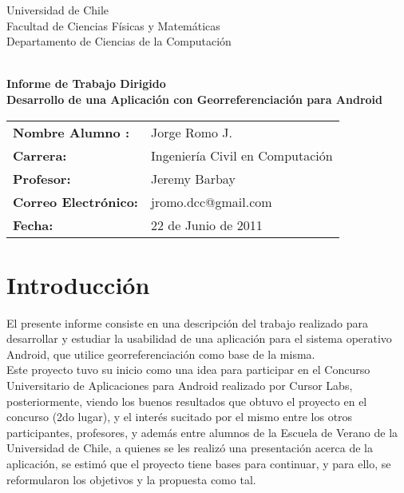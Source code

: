 \documentclass[10pt,letterpaper]{article}
\begin{document}
\begin{titlepage}
\begin{minipage}{12cm} Universidad de Chile
\\ Facultad de Ciencias F\'isicas y Matem\'aticas
\\ Departamento de Ciencias de la Computaci\'on\\
\\
\end{minipage}
\vspace*{2cm}
\begin{center}
\vspace{0.2cm}
{\Huge\bf\vspace{0.5cm} Informe de Trabajo Dirigido}\\
{\Huge\bf\vspace{0.5cm} Desarrollo de una Aplicación con Georreferenciación para Android}\\
\end{center}
\vspace{4cm}
\begin{tabular}{ll}
\bf{Nombre Alumno :}& Jorge Romo J. \\
\bf{Carrera:} & Ingeniería Civil en Computación\\ 
\bf{Profesor:} & Jeremy Barbay  \\ 
\bf{Correo Electrónico:} & jromo.dcc@gmail.com  \\ 
\bf{Fecha:} & 22 de Junio de 2011  \\ 
\end{tabular}
\end{titlepage}
\newpage
\tableofcontents
\setcounter{tocdepth}{1}

\newpage
\section{Introducción}

El presente informe consiste en una descripción del trabajo realizado para desarrollar y estudiar la usabilidad de una aplicación para el sistema operativo Android, que utilice georreferenciación como base de la misma.\\

Este proyecto tuvo su inicio como una idea para participar en el Concurso Universitario de Aplicaciones para Android realizado por Cursor Labs, posteriormente, viendo los buenos resultados que obtuvo el proyecto en el concurso (2do lugar), y el interés sucitado por el mismo entre los otros participantes, profesores, y además entre alumnos de la Escuela de Verano de la Universidad de Chile, a quienes se les realizó una presentación acerca de la aplicación, se estimó que el proyecto tiene bases para continuar, y para ello, se reformularon los objetivos y la propuesta como tal.\\
\end{document}
